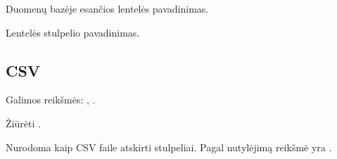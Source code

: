 \documentclass[letterpaper,10pt,lithuanian]{sphinxmanual}
\begin{document}
\begin{fulllineitems}

\pysigstartsignatures
{}
\pysigstopsignatures
\sphinxAtStartPar
Duomenų bazėje esančios lentelės pavadinimas.

\end{fulllineitems}



\begin{fulllineitems}

\pysigstartsignatures
{}
\pysigstopsignatures
\sphinxAtStartPar
Lentelės stulpelio pavadinimas.

\end{fulllineitems}



\subsection{CSV}
\label{\detokenize{saltiniai:csv}}

\begin{fulllineitems}

\pysigstartsignatures
{}
\pysigstopsignatures
\sphinxAtStartPar
Galimos reikšmės: , .

\end{fulllineitems}



\begin{fulllineitems}

\pysigstartsignatures
{}
\pysigstopsignatures
\sphinxAtStartPar
Žiūrėti {\hyperref[\detokenize{formules:failai}]{}}.

\end{fulllineitems}



\begin{fulllineitems}

\pysigstartsignatures
{}
\pysigstopsignatures{}

\begin{fulllineitems}
\label{\detokenize{saltiniai:tabular}}
\pysigstartsignatures
{}
\pysigstopsignatures
\sphinxAtStartPar
Nurodoma kaip CSV faile atskirti stulpeliai. Pagal nutylėjimą
 reikšmė yra \sphinxcode{\sphinxupquote{,}}.

\end{fulllineitems}


\end{fulllineitems}
\end{document}
